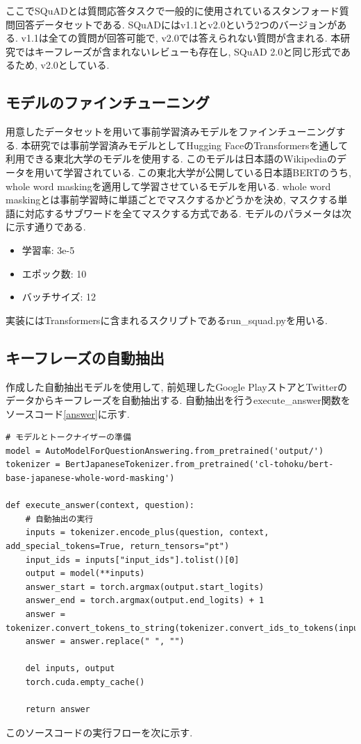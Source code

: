 ここでSQuADとは質問応答タスクで一般的に使用されているスタンフォード質問回答データセットである. 
SQuADにはv1.1とv2.0という2つのバージョンがある. v1.1は全ての質問が回答可能で, v2.0では答えられない質問が含まれる. 本研究ではキーフレーズが含まれないレビューも存在し, SQuAD 2.0と同じ形式であるため, v2.0としている. 

\subsection{モデルのファインチューニング}
用意したデータセットを用いて事前学習済みモデルをファインチューニングする. 本研究では事前学習済みモデルとしてHugging FaceのTransformersを通して利用できる東北大学のモデル\cite{tohoku}を使用する. このモデルは日本語のWikipediaのデータを用いて学習されている\cite{tohoku}. 
この東北大学が公開している日本語BERTのうち, whole word maskingを適用して学習させているモデル\cite{masking}を用いる. whole word maskingとは事前学習時に単語ごとでマスクするかどうかを決め, マスクする単語に対応するサブワードを全てマスクする方式である. モデルのパラメータは次に示す通りである. 
\begin{itemize}
  \item 学習率: 3e-5
  \item エポック数: 10
  \item バッチサイズ: 12
\end{itemize}
実装にはTransformersに含まれるスクリプトであるrun\_squad.pyを用いる. 

\subsection{キーフレーズの自動抽出}
作成した自動抽出モデルを使用して, 前処理したGoogle PlayストアとTwitterのデータからキーフレーズを自動抽出する. 自動抽出を行うexecute\_answer関数をソースコード\ref{answer}に示す. 
\begin{lstlisting}[caption=execute\_answer関数,label=answer]
# モデルとトークナイザーの準備
model = AutoModelForQuestionAnswering.from_pretrained('output/')  
tokenizer = BertJapaneseTokenizer.from_pretrained('cl-tohoku/bert-base-japanese-whole-word-masking') 

def execute_answer(context, question):
    # 自動抽出の実行
    inputs = tokenizer.encode_plus(question, context, add_special_tokens=True, return_tensors="pt")
    input_ids = inputs["input_ids"].tolist()[0]
    output = model(**inputs)
    answer_start = torch.argmax(output.start_logits)  
    answer_end = torch.argmax(output.end_logits) + 1 
    answer = tokenizer.convert_tokens_to_string(tokenizer.convert_ids_to_tokens(input_ids[answer_start:answer_end]))
    answer = answer.replace(" ", "")

    del inputs, output
    torch.cuda.empty_cache()

    return answer
\end{lstlisting}
このソースコードの実行フローを次に示す.  

